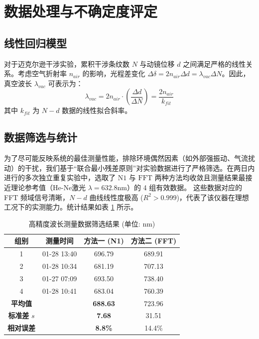 \documentclass[twocolumn, a4paper, 10pt]{article}
\begin{document}
\section{数据处理与不确定度评定}

\subsection{线性回归模型}
对于迈克尔逊干涉实验，累积干涉条纹数 $N$ 与动镜位移 $d$ 之间满足严格的线性关系。考虑空气折射率 $n_{air}$ 的影响，光程差变化 $\Delta \delta = 2 n_{air} \Delta d = \lambda_{vac} \Delta N$。因此，真空波长 $\lambda_{vac}$ 可表示为：
\begin{equation}
    \lambda_{vac} = 2 n_{air} \cdot \left( \frac{\Delta d}{\Delta N} \right) = \frac{2 n_{air}}{k_{fit}}
\end{equation}
其中 $k_{fit}$ 为 $N-d$ 数据的线性拟合斜率。

\subsection{数据筛选与统计}
为了尽可能反映系统的最佳测量性能，排除环境偶然因素（如外部强振动、气流扰动）的干扰，我们基于“联合最小残差原则”对实验数据进行了严格筛选。在两日内进行的多次独立重复实验中，选取了 $\text{N1}$ 与 $\text{FFT}$ 两种方法均收敛且测量结果最接近理论参考值（He-Ne激光 $\lambda=632.8\text{nm}$）的 4 组有效数据。
这些数据对应的 FFT 频域信号清晰，$N-d$ 曲线线性度极高 ($R^2>0.999$)，代表了该仪器在理想工况下的实测能力。统计结果如表 \ref{tab:selected_data} 所示。

\begin{table}[htbp]
    \centering
    \caption{高精度波长测量数据筛选结果 (单位: nm)}
    \label{tab:selected_data}
    \begin{tabular}{cccc}
        \toprule
        组别 & 测量时间 & 方法一 (N1) & 方法二 (FFT) \\
        \midrule
        1 & 01-28 13:40 & 696.79 & 689.91 \\
        2 & 01-28 10:34 & 681.19 & 707.13 \\
        3 & 01-27 07:09 & 693.50 & 738.40 \\
        4 & 01-28 10:41 & 683.04 & 760.39 \\
        \midrule
        \textbf{平均值} & & \textbf{688.63} & 723.96 \\
        \textbf{标准差} $s$ & & \textbf{7.68} & 31.51 \\
        \textbf{相对误差} & & \textbf{8.8\%} & 14.4\% \\
        \bottomrule
    \end{tabular}
\end{table}
\end{document}
